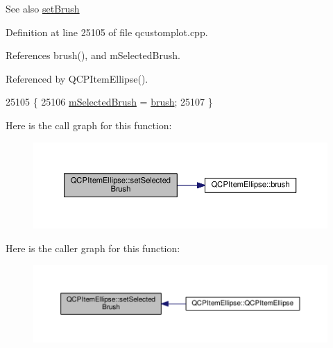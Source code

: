 \begin{DoxySeeAlso}{See also}
\hyperlink{class_q_c_p_item_ellipse_a49fc74e6965834e873d027d026def798}{set\+Brush} 
\end{DoxySeeAlso}


Definition at line 25105 of file qcustomplot.\+cpp.



References brush(), and m\+Selected\+Brush.



Referenced by Q\+C\+P\+Item\+Ellipse().


\begin{DoxyCode}
25105                                                          \{
25106   \hyperlink{class_q_c_p_item_ellipse_a2e49d5547478aa36910ed8a2dcc8a5c0}{mSelectedBrush} = \hyperlink{class_q_c_p_item_ellipse_ac012e4fd59fdb1afb6554937bae8f7e1}{brush};
25107 \}
\end{DoxyCode}


Here is the call graph for this function\+:\nopagebreak
\begin{figure}[H]
\begin{center}
\leavevmode
\includegraphics[width=350pt]{class_q_c_p_item_ellipse_a9693501cfaa43a099655c75bed0dab3f_cgraph}
\end{center}
\end{figure}




Here is the caller graph for this function\+:\nopagebreak
\begin{figure}[H]
\begin{center}
\leavevmode
\includegraphics[width=350pt]{class_q_c_p_item_ellipse_a9693501cfaa43a099655c75bed0dab3f_icgraph}
\end{center}
\end{figure}


